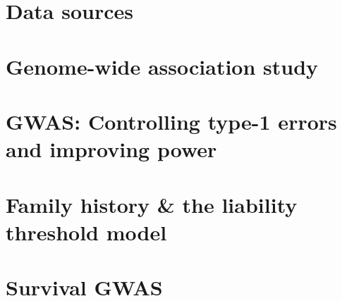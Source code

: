 \section{Data sources}




\section{Genome-wide association study}


\section{GWAS: Controlling type-1 errors and improving power}


\section{Family history \& the liability threshold model}


\section{Survival GWAS}






